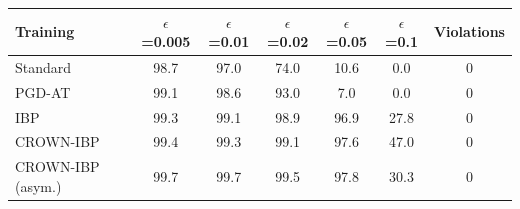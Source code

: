\begin{tabular}{lcccccc}
\toprule
Training & $\epsilon$=0.005 & $\epsilon$=0.01 & $\epsilon$=0.02 & $\epsilon$=0.05 & $\epsilon$=0.1 & Violations \\
\midrule
Standard & 98.7 & 97.0 & 74.0 & 10.6 & 0.0 & 0 \\
PGD-AT & 99.1 & 98.6 & 93.0 & 7.0 & 0.0 & 0 \\
IBP & 99.3 & 99.1 & 98.9 & 96.9 & 27.8 & 0 \\
CROWN-IBP & 99.4 & 99.3 & 99.1 & 97.6 & 47.0 & 0 \\
CROWN-IBP (asym.) & 99.7 & 99.7 & 99.5 & 97.8 & 30.3 & 0 \\
\bottomrule
\end{tabular}